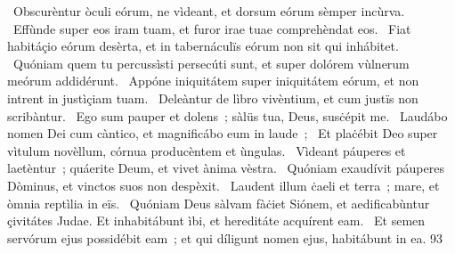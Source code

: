 {~Obscurèntur òculi eórum, ne vìdeant, et dorsum eórum sèmper incùrva. 
~Effùnde super eos iram tuam, et furor irae tuae comprehèndat eos. 
~Fiat habitáçio eórum desèrta, et in tabernáculïs eórum non sit qui inhábitet. 
~Quóniam quem tu percussìsti persecúti sunt, et super dolórem vùlnerum meórum addidérunt. 
~Appóne iniquitátem super iniquitátem eórum, et non intrent in justìçiam tuam. 
~Deleàntur de lìbro vivèntium, et cum justïs non scribàntur. 
~Ego sum pauper et dolens~; sàlüs tua, Deus, susċépit me. 
~Laudábo nomen Dei cum càntico, et magnificábo eum in laude~; 
~Et plaċébit Deo super vìtulum novèllum, córnua producèntem et ùngulas. 
~Vìdeant páuperes et laetèntur~; quáerite Deum, et vivet ànima vèstra. 
~Quóniam exaudívit páuperes Dòminus, et vinctos suos non despèxit. 
~Laudent illum ċaeli et terra~; mare, et òmnia reptìlia in eïs. 
~Quóniam Deus sàlvam fàċiet Siónem, et aedificabùntur çivitátes Judae. Et inhabitábunt ìbi, et hereditáte acquírent eam. 
~Et semen servórum ejus possidébit eam~; et qui díligunt nomen ejus, habitábunt in ea. 
}
{9}{3}
